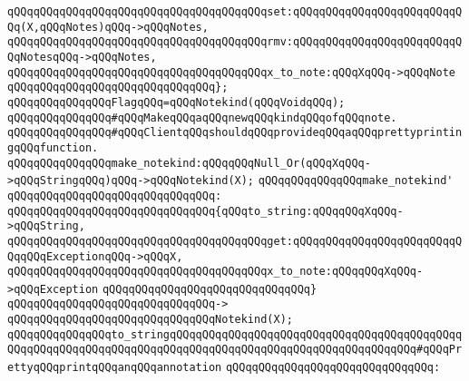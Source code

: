 \verb|qQQqqQQqqQQqqQQqqQQqqQQqqQQqqQQqqQQqqQQqset:qQQqqQQqqQQqqQQqqQQqqQQqqQQq(X,qQQqNotes)qQQq->qQQqNotes,|\newline
\verb|qQQqqQQqqQQqqQQqqQQqqQQqqQQqqQQqqQQqqQQqrmv:qQQqqQQqqQQqqQQqqQQqqQQqqQQqNotesqQQq->qQQqNotes,|\newline
\verb|qQQqqQQqqQQqqQQqqQQqqQQqqQQqqQQqqQQqqQQqx_to_note:qQQqXqQQq->qQQqNote|\newline
\verb|qQQqqQQqqQQqqQQqqQQqqQQqqQQqqQQq};|\newline
\newline
\verb|qQQqqQQqqQQqqQQqFlagqQQq=qQQqNotekind(qQQqVoidqQQq);|\newline
\newline
\newline
\verb|qQQqqQQqqQQqqQQq#qQQqMakeqQQqaqQQqnewqQQqkindqQQqofqQQqnote.|\newline
\verb|qQQqqQQqqQQqqQQq#qQQqClientqQQqshouldqQQqprovideqQQqaqQQqprettyprintingqQQqfunction.|\newline
\newline
\verb|qQQqqQQqqQQqqQQqmake_notekind:qQQqqQQqNull_Or(qQQqXqQQq->qQQqStringqQQq)qQQq->qQQqNotekind(X);|\newline
\newline
\verb|qQQqqQQqqQQqqQQqmake_notekind'|\newline
\verb|qQQqqQQqqQQqqQQqqQQqqQQqqQQqqQQq:|\newline
\verb|qQQqqQQqqQQqqQQqqQQqqQQqqQQqqQQq{qQQqto_string:qQQqqQQqXqQQq->qQQqString,|\newline
\verb|qQQqqQQqqQQqqQQqqQQqqQQqqQQqqQQqqQQqqQQqget:qQQqqQQqqQQqqQQqqQQqqQQqqQQqqQQqExceptionqQQq->qQQqX,|\newline
\verb|qQQqqQQqqQQqqQQqqQQqqQQqqQQqqQQqqQQqqQQqx_to_note:qQQqqQQqXqQQq->qQQqException|\newline
\verb|qQQqqQQqqQQqqQQqqQQqqQQqqQQqqQQq}|\newline
\verb|qQQqqQQqqQQqqQQqqQQqqQQqqQQqqQQq->|\newline
\verb|qQQqqQQqqQQqqQQqqQQqqQQqqQQqqQQqNotekind(X);|\newline
\newline
\newline
\newline
\verb|qQQqqQQqqQQqqQQqto_stringqQQqqQQqqQQqqQQqqQQqqQQqqQQqqQQqqQQqqQQqqQQqqQQqqQQqqQQqqQQqqQQqqQQqqQQqqQQqqQQqqQQqqQQqqQQqqQQqqQQqqQQqqQQq#qQQqPrettyqQQqprintqQQqanqQQqannotation|\newline
\verb|qQQqqQQqqQQqqQQqqQQqqQQqqQQqqQQq:|\newline
